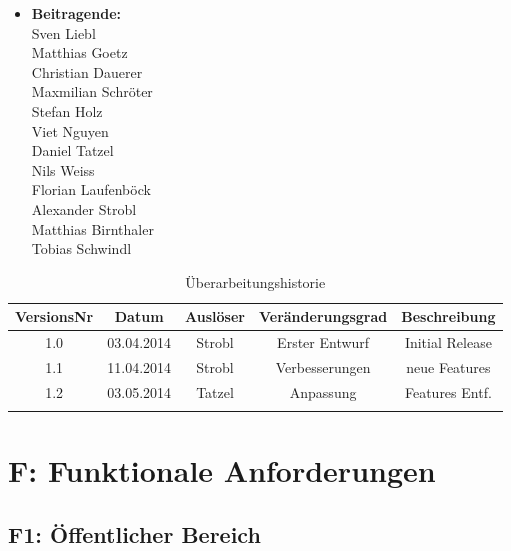 \documentclass[10pt,a4paper]{scrartcl}
\begin{document}
\newcommand{\Version}{1.2}






\newpage
\begin{itemize}
\item[] \textbf{\large Beitragende:}\\
Sven Liebl\\
Matthias Goetz\\
Christian Dauerer\\
Maxmilian Schröter\\
Stefan Holz\\
Viet Nguyen\\
Daniel Tatzel\\
Nils Weiss\\
Florian Laufenböck\\
Alexander Strobl\\
Matthias Birnthaler\\
Tobias Schwindl
\end{itemize}

\bigskip

\begin{table}[!h]
 	\centering
	\begin{tabular}{|c|c|c|c||c|} 
	\hline
	\textbf{VersionsNr} &  \textbf{Datum} & \textbf{Auslöser} & \textbf{Veränderungsgrad} & \textbf{Beschreibung} \\
	\hline
	1.0 & 03.04.2014 & Strobl & Erster Entwurf & Initial Release \\
	\hline
	1.1 & 11.04.2014 & Strobl & Verbesserungen & neue Features \\
	\hline
	1.2 & 03.05.2014 & Tatzel & Anpassung & Features Entf. \\
	\hline
	\text{ } & \text{ } & \text{ } & \text{ } & \text{ } \\
	\hline
	\end{tabular}

\caption{Überarbeitungshistorie}
\end{table}

\newpage
\tableofcontents


\newpage
\section{F: Funktionale Anforderungen}


\subsection{F1: Öffentlicher Bereich}
\end{document}
